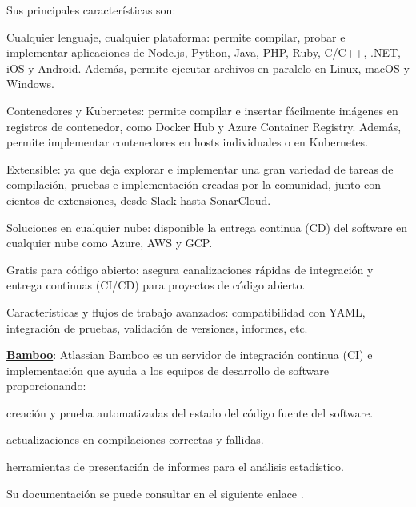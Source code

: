 \begin{compactitem}
    Sus principales características son:
    \begin{compactitem}
        \item Cualquier lenguaje, cualquier plataforma: permite compilar, probar e implementar aplicaciones de Node.js, Python, Java, PHP, Ruby, C/C++, .NET, iOS y Android. Además, permite ejecutar archivos en paralelo en Linux, macOS y Windows.
        \item Contenedores y Kubernetes: permite compilar e insertar fácilmente imágenes en registros de contenedor, como Docker Hub y Azure Container Registry. Además, permite implementar contenedores en hosts individuales o en Kubernetes.
        \item Extensible: ya que deja explorar e implementar una gran variedad de tareas de compilación, pruebas e implementación creadas por la comunidad, junto con cientos de extensiones, desde Slack hasta SonarCloud.
        \item Soluciones en cualquier nube: disponible la entrega continua (CD) del software en cualquier nube como Azure, AWS y GCP.
        \item Gratis para código abierto: asegura canalizaciones rápidas de integración y entrega continuas (CI/CD) para proyectos de código abierto.
        \item Características y flujos de trabajo avanzados: compatibilidad con YAML, integración de pruebas, validación de versiones, informes, etc.
    \end{compactitem}
    \item \textbf{\underline{Bamboo}}: Atlassian Bamboo es un servidor de integración continua (CI) e implementación que ayuda a los equipos de desarrollo de software proporcionando:
    \begin{compactitem}
        \item creación y prueba automatizadas del estado del código fuente del software.
        \item actualizaciones en compilaciones correctas y fallidas.
        \item herramientas de presentación de informes para el análisis estadístico.
    \end{compactitem}

    Su documentación se puede consultar en el siguiente enlace \cite{bamboo}.


\end{compactitem}
